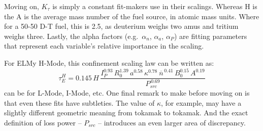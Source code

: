 Moving on, $K_\tau$ is simply a constant fit-makers use in their scalings. Whereas H is the   A is the average mass number of the fuel source, in atomic mass units. Where for a 50-50 D-T fuel, this is 2.5, as deuterium weighs two amus and tritium weighs three. Lastly, the alpha factors (e.g.\ $\alpha_n$, $\alpha_a$, $\alpha_P$) are fitting parameters that represent each variable's relative importance in the scaling.

For ELMy H-Mode, this confinement scaling law can be written as:
\begin{equation}
	\tau_E^H = 0.145 \, H \, \frac{
		I_P^{0.93} \, R_0^{1.39} \, a^{0.58} \, \kappa^{0.78} \ \overline{n}^{\, 0.41} \, B_0^{0.15} \, A^{0.19}
	}{ P_{src} ^ {\,0.69} }
	\label{eq:tau_h}
\end{equation}
 can be  for L-Mode, I-Mode, etc. One final remark to make before moving on is that even these fits have subtleties. The value of $\kappa$, for example, may have a slightly different geometric meaning from tokamak to tokamak. And the exact definition of loss power -- $P_{src}$ -- introduces an even larger area of discrepancy.  

